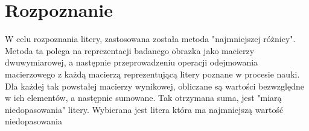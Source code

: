 \documentclass[a4paper, 12pt]{article}
\begin{document}
\section{Rozpoznanie}
W celu rozpoznania litery, zastosowana została metoda "najmniejszej różnicy". Metoda ta polega na reprezentacji badanego obrazka jako macierzy dwuwymiarowej, a następnie przeprowadzeniu operacji odejmowania macierzowego z każdą macierzą reprezentującą litery poznane w procesie nauki.
Dla każdej tak powstałej macierzy wynikowej, obliczane są wartości bezwzględne w ich elementów, a następnie sumowane.
Tak otrzymana suma, jest "miarą niedopasowania" litery.
Wybierana jest litera która ma najmniejszą wartość niedopasowania
\end{document}
